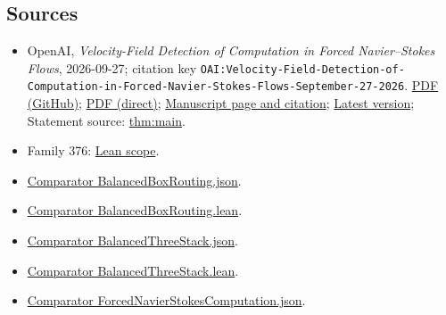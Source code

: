 \documentclass[11pt]{article}
\begin{document}
\subsection{Sources}
\begin{itemize}
\item OpenAI, \emph{Velocity-Field Detection of Computation in Forced Navier–Stokes Flows}, 2026-09-27; citation key \texttt{OAI:Velocity-Field-Detection-of-Computation-in-Forced-Navier-Stokes-Flows-September-27-2026}. \href{https://github.com/openai/math/blob/adc7f1241b42e322a6451854ab7e4b4c146bf78a/preprints/Velocity-Field-Detection-of-Computation-in-Forced-Navier-Stokes-Flows-September-27-2026/manuscript.pdf}{PDF (GitHub)}; \href{https://github.com/openai/math/raw/adc7f1241b42e322a6451854ab7e4b4c146bf78a/preprints/Velocity-Field-Detection-of-Computation-in-Forced-Navier-Stokes-Flows-September-27-2026/manuscript.pdf}{PDF (direct)}; \href{https://github.com/openai/math/blob/adc7f1241b42e322a6451854ab7e4b4c146bf78a/preprints/Velocity-Field-Detection-of-Computation-in-Forced-Navier-Stokes-Flows-September-27-2026/README.md}{Manuscript page and citation}; \href{https://github.com/openai/math/blob/main/preprints/Velocity-Field-Detection-of-Computation-in-Forced-Navier-Stokes-Flows-September-27-2026/manuscript.pdf}{Latest version}; Statement source: \href{https://github.com/openai/math/blob/adc7f1241b42e322a6451854ab7e4b4c146bf78a/preprints/Velocity-Field-Detection-of-Computation-in-Forced-Navier-Stokes-Flows-September-27-2026/build/main.tex\#L98}{thm:main}.
\item Family 376: \href{https://github.com/openai/math/blob/adc7f1241b42e322a6451854ab7e4b4c146bf78a/lean/docs/376.md}{Lean scope}.
\item \href{https://github.com/openai/math/blob/adc7f1241b42e322a6451854ab7e4b4c146bf78a/lean/ComparatorChallenges/BalancedBoxRouting.json}{Comparator BalancedBoxRouting.json}.
\item \href{https://github.com/openai/math/blob/adc7f1241b42e322a6451854ab7e4b4c146bf78a/lean/ComparatorChallenges/BalancedBoxRouting.lean}{Comparator BalancedBoxRouting.lean}.
\item \href{https://github.com/openai/math/blob/adc7f1241b42e322a6451854ab7e4b4c146bf78a/lean/ComparatorChallenges/BalancedThreeStack.json}{Comparator BalancedThreeStack.json}.
\item \href{https://github.com/openai/math/blob/adc7f1241b42e322a6451854ab7e4b4c146bf78a/lean/ComparatorChallenges/BalancedThreeStack.lean}{Comparator BalancedThreeStack.lean}.
\item \href{https://github.com/openai/math/blob/adc7f1241b42e322a6451854ab7e4b4c146bf78a/lean/ComparatorChallenges/ForcedNavierStokesComputation.json}{Comparator ForcedNavierStokesComputation.json}.

\end{itemize}
\end{document}
